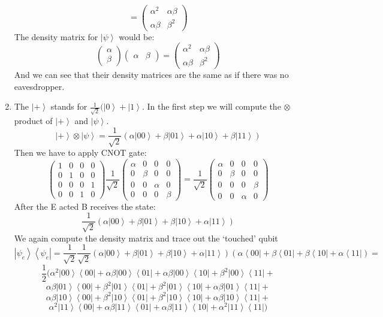 \documentclass[a4paper,10pt]{article}
\newcommand{\bra}[1]{\ensuremath{\left\langle#1\right|}} %
\newcommand{\ket}[1]{\ensuremath{\left|#1\right\rangle}} %
\newcommand{\asp}{\ensuremath{\frac{1}{\sqrt{2}}}}
\newcommand{\ap}{\ensuremath{\frac{1}{2}}}
\begin{document}
\begin{enumerate}[1.]
$$=\left(\begin{array}{cc}\alpha^2&\alpha\beta\\\alpha\beta&\beta^2\end{array}\right)
$$
The density matrix for \ket{\psi} would be:
$$
\left(\begin{array}{c}\alpha\\\beta\end{array}\right)
\left(\begin{array}{cc}\alpha&\beta\end{array}\right)=
\left(\begin{array}{cc}\alpha^2&\alpha\beta\\\alpha\beta&\beta^2\end{array}\right)
$$
And we can see that their density matrices are the same as if there was no eavesdropper.

\item The \ket{+} stands for $\frac{1}{\sqrt{2}} (\ket{0} + \ket{1}$.
In the first step we will compute the $\otimes$ product of \ket{+} and \ket{\psi}.
$$
\ket{+}\otimes\ket{\psi} = \asp (\alpha \ket{00}  + \beta\ket{01} + \alpha \ket{10} + \beta \ket{11})
$$
Then we have to apply CNOT gate:
$$
\left(
\begin{array}{cccc}
1 & 0 & 0 & 0\\
0 & 1 & 0 & 0\\
0 & 0 & 0 & 1\\
0 & 0 & 1 & 0
\end{array}
\right)
\asp
\left(
\begin{array}{cccc}
\alpha & 0 & 0 & 0\\
0 & \beta & 0 & 0\\
0 & 0 & \alpha & 0\\
0 & 0 & 0 & \beta
\end{array}
\right)
=
\asp
\left(
\begin{array}{cccc}
\alpha & 0 & 0 & 0\\
0 & \beta & 0 & 0\\
0 & 0 & 0 & \beta\\
0 & 0 & \alpha & 0
\end{array}
\right)
$$
After the E acted B receives the state:
$$
\asp (\alpha \ket{00}  + \beta\ket{01} + \beta \ket{10} + \alpha \ket{11} )
$$
We again compute the density matrix and trace out the `touched' qubit
$$
\ket{\psi_e}\bra{\psi_e} = \asp \asp (\alpha\ket{00} + \beta\ket{01} + \beta\ket{10} + \alpha\ket{11})(\alpha\bra{00} + \beta\bra{01} + \beta\bra{10} + \alpha\bra{11})=
$$
$$
\ap ( \alpha^2\ket{00}\bra{00} + \alpha\beta\ket{00}\bra{01}+\alpha\beta \ket{00}\bra{10} + \beta^2\ket{00}\bra{11} +
$$
$$
\alpha\beta\ket{01}\bra{00} +\beta^2\ket{01}\bra{01} +\beta^2\ket{01}\bra{10} +\alpha\beta\ket{01}\bra{11} +
$$
$$
\alpha\beta\ket{10}\bra{00} +\beta^2\ket{10}\bra{01} + \beta^2\ket{10}\bra{10} +\alpha\beta\ket{10}\bra{11} + 
$$
$$
\alpha^2\ket{11}\bra{00} +\alpha\beta\ket{11}\bra{01} + \alpha\beta \ket{11}\bra{10}+\alpha^2\ket{11}\bra{11})
$$


\end{enumerate}
\end{document}
